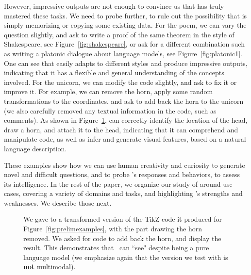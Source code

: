 However, impressive outputs are not enough to convince us that {\DV} has truly mastered these tasks. We need to probe further, to rule out the possibility that {\DV} is simply memorizing or copying some existing data. For the poem, we can vary the question slightly, and ask {\DV} to write a proof of the same theorem in the style of Shakespeare, see Figure~\ref{fig:shakespeare}, or ask for a different combination such as writing a platonic dialogue about language models, see Figure~\ref{fig:platonic1}. One can see that {\DV} easily adapts to different styles and produce impressive outputs, indicating that it has a flexible and general understanding of the concepts involved. For the unicorn, we can modify the code slightly, and ask {\DV} to fix it or improve it. For example, we can remove the horn, apply some random transformations to the coordinates, and ask {\DV} to add back the horn to the unicorn (we also carefully removed any textual information in the code, such as comments). As shown in Figure~\ref{fig:unicorn2}, {\DV} can correctly identify the location of the head, draw a horn, and attach it to the head, indicating that it can comprehend and manipulate code, as well as infer and generate visual features, based on a natural language description.
\newline

These examples show how we can use human creativity and curiosity to generate novel and difficult questions, and to probe \DV's responses and behaviors, to assess its intelligence. In the rest of the paper, we organize our study of {\DV} around use cases, covering a variety of domains and tasks, and highlighting \DV's strengths and weaknesses. We describe those next.

\begin{figure}
\centering
{}
\caption{We gave to {\DV} a transformed version of the TikZ code it produced for Figure~\ref{fig:prelimexamples}, with the part drawing the horn removed. We asked for code to add back the horn, and display the result. This demonstrates that \DV\ can ``see" despite being a pure language model (we emphasize again that the version we test with is \textbf{not} multimodal).}
\label{fig:unicorn2}
\end{figure}

